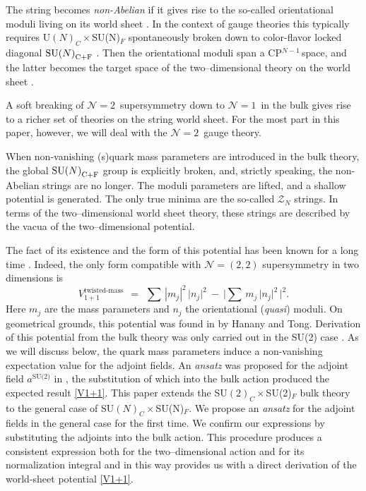 \documentclass[12pt]{article}
\def\beq{\begin{equation}}
\def\eeq{\end{equation}}
\newcommand{\nonen}{${\mathcal N}=1$}
\newcommand{\ntwon}{${\mathcal N}=2$}
\newcommand{\ntwot}{${\mathcal N}= \left(2,2\right) $ }
\newcommand{\mc}[1]{\mathcal{#1}}
\def\cfl {$\text{SU($N$)}_{\rm C+F}$ }
\newcommand{\cpn}{CP$^{N-1}$\,}
\newcommand{\ansatz}{{\it ansatz} }
\begin{document}
	The string becomes {\it non-Abelian} if it gives rise to the so-called orientational moduli living on
	its world sheet \cite{HT1,ABEKY,SYmon,HT2}. In the context of gauge theories this typically requires U$(N)_C\times$SU(N)$_F$
	spontaneously broken down to color-flavor locked  diagonal $\!$\cfl.
	Then the orientational moduli  span a \cpn space, and 
	the latter becomes the target space of the two--dimensional theory on the world sheet \cite{SYrev}.

	A soft breaking of \ntwon\, supersymmetry down to
	\nonen\, in the bulk gives rise to a richer  set of theories on the string world sheet.
	For the most part in this paper, however, we will deal with the \ntwon\, gauge theory.

	When non-vanishing (s)quark mass parameters are introduced in  the bulk theory, 
	the global \cfl group is explicitly broken, and, strictly speaking,
	the non-Abelian strings are no longer.
	The moduli parameters are lifted, and a shallow potential is generated. The only true minima  are the so-called $ \mc{Z}_N $ strings.
	In terms of the two--dimensional world sheet theory, these strings are described by
	the vacua of the two--dimensional potential.

	The fact of its existence and the form of this potential has been known for a long time 
\cite{Dorey:1998yh,Shifman:2006bs}.
	Indeed, the only form compatible with \ntwot supersymmetry in two dimensions is
\beq
\label{V1+1}
	V_{1+1}^\text{twisted-mass}    ~~=~~    \sum\, | m_j |^2\, \big| n_j \big|^2   ~-~  \Big| \sum\, m_j\, \big| n_j \big|^2 \,\Big|^2.
\eeq
	Here $ m_j $ are the mass parameters and $ n_j $ the orientational ({\it quasi}) moduli.
	On geometrical grounds, this potential was found in \cite{HT2} by Hanany and Tong. 
	Derivation of this potential from the bulk theory was only carried out in the SU(2) case \cite{SYmon}.
	As we will discuss below, the quark mass parameters induce a non-vanishing expectation value for the adjoint fields.
	An \ansatz was proposed for the adjoint field $ a^\text{SU(2)} $ in \cite{SYmon},
	the substitution of which into the bulk action produced the expected result \eqref{V1+1}.
	This paper extends the SU$(2)_C\times$SU(2)$_F$ bulk theory to the general case of SU$(N)_C\times$SU(N)$_F$.
	We propose an \ansatz for the adjoint fields in the general case  for the first time.
	We confirm our expressions by substituting the adjoints into the bulk action. 
	This procedure produces a consistent expression both for the two--dimensional action and for its normalization integral
	and in this way provides us with a direct
	derivation of the world-sheet potential \eqref{V1+1}.
\end{document}

